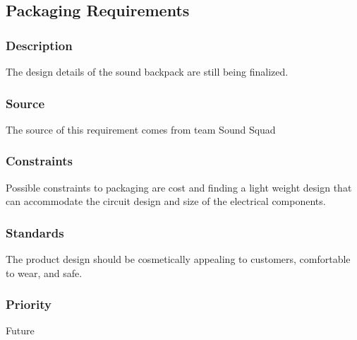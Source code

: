 \subsection{Packaging Requirements}
\subsubsection{Description}
The design details of the sound backpack are still being finalized.
\subsubsection{Source}
The source of this requirement comes from team Sound Squad
\subsubsection{Constraints}
Possible constraints to packaging are cost and finding a light weight design that can accommodate the circuit design and size of the electrical components. 
\subsubsection{Standards}
The product design should be cosmetically appealing to customers, comfortable to wear, and safe.
\subsubsection{Priority}
Future